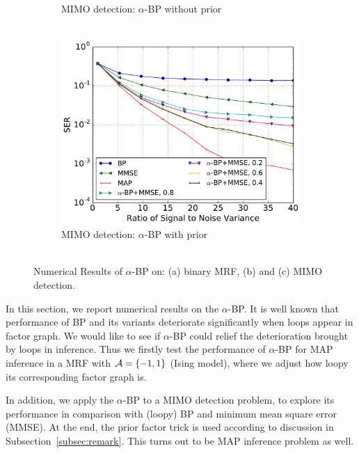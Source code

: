 \documentclass{article}
\begin{document}
\begin{figure}[!h]
\begin{subfigure}{.5\textwidth}
    \vspace{-0.6cm}
    \caption{MIMO detection: $\alpha$-BP without prior\\~}\label{fig:mimo_a}
  \end{subfigure}
  \begin{subfigure}{.5\textwidth}
    \includegraphics[width=1\linewidth]{figures/prior_mmse_alpha_compare_crop.pdf}
    \vspace{-0.6cm}
    \caption{MIMO detection: $\alpha$-BP with prior\\~}\label{fig:mimo_b}
  \end{subfigure}
  \vspace{-0.3cm}
  \caption{Numerical Results of $\alpha$-BP on: (a) binary MRF, (b) and (c) MIMO detection.}
  \vspace{0.3cm}
  \label{fig:mimo_detection}
\end{figure}

In this section, we report numerical results on the $\alpha$-BP. It is well known that performance of BP and its variants deteriorate significantly when loops appear in factor graph. We would like to see if $\alpha$-BP could relief the deterioration brought by loops in inference. Thus we firstly test the performance of $\alpha$-BP for MAP inference in a MRF with $\mathcal{A}=\{-1,1\}$ (Ising model), where we adjust how loopy its corresponding factor graph is.

In addition, we apply the $\alpha$-BP to a MIMO detection problem, to explore its performance in comparison with (loopy) BP and minimum mean square error (MMSE). At the end, the prior factor trick is used according to discussion in Subsection~\ref{subsec:remark}. This turns out to be MAP inference problem as well.
\end{document}
